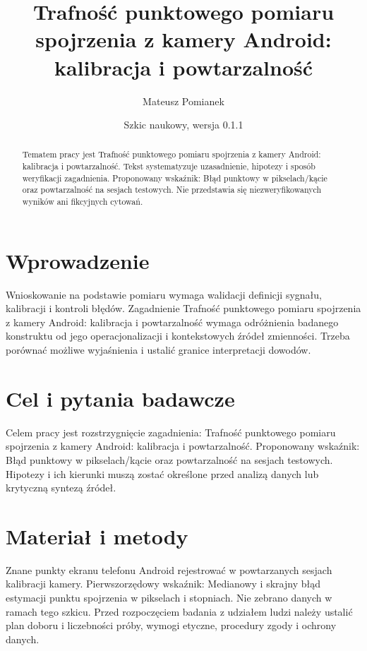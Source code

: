 \documentclass[11pt,a4paper]{article}
\title{Trafność punktowego pomiaru spojrzenia z kamery Android: kalibracja i powtarzalność}
\author{Mateusz Pomianek}
\date{Szkic naukowy, wersja 0.1.1}
\begin{document}
\maketitle

\begin{abstract}

Tematem pracy jest Trafność punktowego pomiaru spojrzenia z kamery Android: kalibracja i powtarzalność. Tekst systematyzuje uzasadnienie, hipotezy i sposób weryfikacji zagadnienia. Proponowany wskaźnik: Błąd punktowy w pikselach/kącie oraz powtarzalność na sesjach testowych. Nie przedstawia się niezweryfikowanych wyników ani fikcyjnych cytowań.

\end{abstract}

\section{Wprowadzenie}

Wnioskowanie na podstawie pomiaru wymaga walidacji definicji sygnału, kalibracji i kontroli błędów. Zagadnienie Trafność punktowego pomiaru spojrzenia z kamery Android: kalibracja i powtarzalność wymaga odróżnienia badanego konstruktu od jego operacjonalizacji i kontekstowych źródeł zmienności. Trzeba porównać możliwe wyjaśnienia i ustalić granice interpretacji dowodów.

\section{Cel i pytania badawcze}

Celem pracy jest rozstrzygnięcie zagadnienia: Trafność punktowego pomiaru spojrzenia z kamery Android: kalibracja i powtarzalność. Proponowany wskaźnik: Błąd punktowy w pikselach/kącie oraz powtarzalność na sesjach testowych. Hipotezy i ich kierunki muszą zostać określone przed analizą danych lub krytyczną syntezą źródeł.

\section{Materiał i metody}

Znane punkty ekranu telefonu Android rejestrować w powtarzanych sesjach kalibracji kamery. Pierwszorzędowy wskaźnik: Medianowy i skrajny błąd estymacji punktu spojrzenia w pikselach i stopniach. Nie zebrano danych w ramach tego szkicu. Przed rozpoczęciem badania z udziałem ludzi należy ustalić plan doboru i liczebności próby, wymogi etyczne, procedury zgody i ochrony danych.
\end{document}
